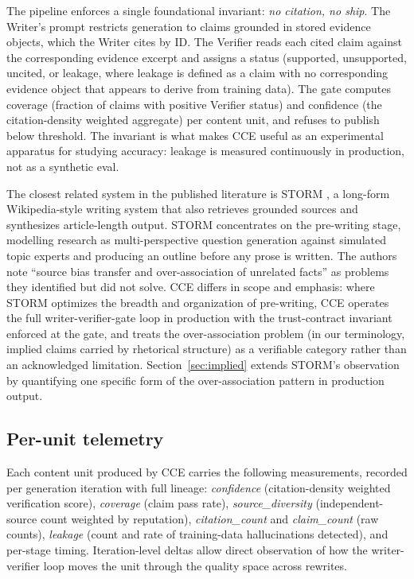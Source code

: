 \documentclass[11pt]{article}
\begin{document}
The pipeline enforces a single foundational invariant: \emph{no citation,
no ship}. The Writer's prompt restricts generation to claims grounded in
stored evidence objects, which the Writer cites by ID. The Verifier reads
each cited claim against the corresponding evidence excerpt and assigns
a status (supported, unsupported, uncited, or leakage, where leakage is
defined as a claim with no corresponding evidence object that appears
to derive from training data). The gate computes coverage (fraction of
claims with positive Verifier status) and confidence (the citation-density
weighted aggregate) per content unit, and refuses to publish below
threshold. The invariant is what makes CCE useful as an experimental
apparatus for studying accuracy: leakage is measured continuously in
production, not as a synthetic eval.

The closest related system in the published literature is STORM
\citep{shao_storm_2024}, a long-form Wikipedia-style writing system that
also retrieves grounded sources and synthesizes article-length output.
STORM concentrates on the pre-writing stage, modelling research as
multi-perspective question generation against simulated topic experts and
producing an outline before any prose is written. The authors note
``source bias transfer and over-association of unrelated facts'' as
problems they identified but did not solve. CCE differs in scope and
emphasis: where STORM optimizes the breadth and organization of
pre-writing, CCE operates the full writer-verifier-gate loop in
production with the trust-contract invariant enforced at the gate, and
treats the over-association problem (in our terminology, implied claims
carried by rhetorical structure) as a verifiable category rather than an
acknowledged limitation. Section~\ref{sec:implied} extends STORM's
observation by quantifying one specific form of the over-association
pattern in production output.

\subsection{Per-unit telemetry}

Each content unit produced by CCE carries the following measurements,
recorded per generation iteration with full lineage:
\textit{confidence} (citation-density weighted verification score),
\textit{coverage} (claim pass rate),
\textit{source\_diversity} (independent-source count weighted by reputation),
\textit{citation\_count} and \textit{claim\_count} (raw counts),
\textit{leakage} (count and rate of training-data hallucinations
detected), and per-stage timing. Iteration-level deltas allow direct
observation of how the writer-verifier loop moves the unit through the
quality space across rewrites.
\end{document}
